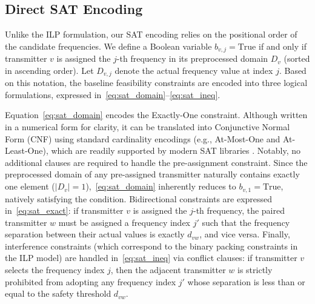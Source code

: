 \subsection{Direct SAT Encoding}
\label{subsec:sat_encoding}

Unlike the ILP formulation, our SAT encoding relies on the positional order of the candidate frequencies. We define a Boolean variable $b_{v,j} = \text{True}$ if and only if transmitter $v$ is assigned the $j$-th frequency in its preprocessed domain $D_v$ (sorted in ascending order). Let $D_{v,j}$ denote the actual frequency value at index $j$. Based on this notation, the baseline feasibility constraints are encoded into three logical formulations, expressed in~\eqref{eq:sat_domain}--\eqref{eq:sat_ineq}.

Equation~\eqref{eq:sat_domain} encodes the Exactly-One constraint. Although written in a numerical form for clarity, it can be translated into Conjunctive Normal Form (CNF) using standard cardinality encodings (e.g., At-Most-One and At-Least-One), which are readily supported by modern SAT libraries \cite{imms-sat18, itk-sat24}.
Notably, no additional clauses are required to handle the pre-assignment constraint. Since the preprocessed domain of any pre-assigned transmitter naturally contains exactly one element ($|D_v| = 1$),~\eqref{eq:sat_domain} inherently reduces to $b_{v,1} = \text{True}$, natively satisfying the condition. 
Bidirectional constraints are expressed in~\eqref{eq:sat_exact}: if transmitter $v$ is assigned the $j$-th frequency, the paired transmitter $w$ must be assigned a frequency index $j'$ such that the frequency separation between their actual values is exactly $d_{vw}$, and vice versa. 
Finally, interference constraints (which correspond to the binary packing constraints in the ILP model) are handled in~\eqref{eq:sat_ineq} via conflict clauses: if transmitter $v$ selects the frequency index $j$, then the adjacent transmitter $w$ is strictly prohibited from adopting any frequency index $j'$ whose separation is less than or equal to the safety threshold $d_{vw}$.
